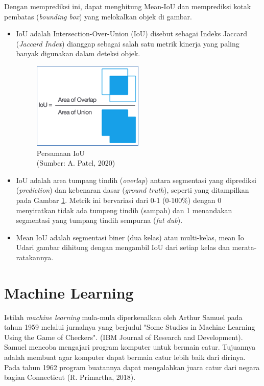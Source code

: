 Dengan memprediksi ini, dapat menghitung Mean-IoU dan memprediksi kotak pembatas (\textit{bounding box}) yang melokalkan objek di gambar.
\begin{itemize}
	\item IoU adalah Intersection-Over-Union (IoU) disebut sebagai Indeks Jaccard (\textit{Jaccard Index}) dianggap sebagai salah satu metrik kinerja yang paling banyak digunakan dalam deteksi objek. 

\begin{figure}[H]
	\vspace{-0.1cm}
	\begin{center}
		\includegraphics[width=0.4\columnwidth]{bab2/Gambar/Picture7.png}
	\end{center}
	\vspace{-0.2cm}
	\caption{Persamaan IoU\\(Sumber: A. Patel, 2020)}\label{img:Persamaan-IOU}
\end{figure}

	\item IoU adalah area tumpang tindih (\textit{overlap}) antara segmentasi yang diprediksi (\textit{prediction}) dan kebenaran dasar (\textit{ground truth}), seperti yang ditampilkan pada Gambar \ref{img:Persamaan-IOU}. Metrik ini bervariasi dari 0-1 (0-100\%) dengan 0 menyiratkan tidak ada tumpeng tindih (sampah) dan 1 menandakan segmentasi yang tumpang tindih sempurna (\textit{fat dub}).
	
	\item Mean IoU adalah segmentasi biner (dua kelas) atau multi-kelas, mean Io Udari gambar dihitung dengan mengambil IoU dari setiap kelas dan merata-ratakannya. 

\end{itemize}

\section{Machine Learning}
\hspace{1,2cm}Istilah \textit{machine learning} mula-mula diperkenalkan oleh Arthur Samuel pada tahun 1959 melalui jurnalnya yang berjudul "Some Studies in Machine Learning Using the Game of Checkers". (IBM Journal of Research and Development). Samuel mencoba mengajari program komputer untuk bermain catur. Tujuannya adalah membuat agar komputer dapat bermain catur lebih baik dari dirinya. Pada tahun 1962 program buatannya dapat mengalahkan juara catur dari negara bagian Connecticut (R. Primartha, 2018).

